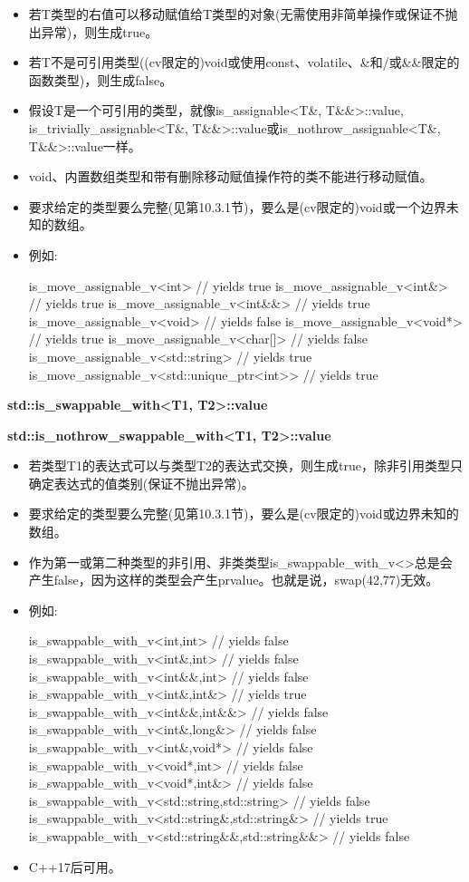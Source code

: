 \begin{itemize}
\item
若T类型的右值可以移动赋值给T类型的对象(无需使用非简单操作或保证不抛出异常)，则生成true。

\item
若T不是可引用类型((cv限定的)void或使用const、volatile、\&和/或\&\&限定的函数类型)，则生成false。

\item
假设T是一个可引用的类型，就像is\_assignable<T\&, T\&\&>::value, is\_trivially\_assignable<T\&, T\&\&>::value或is\_nothrow\_assignable<T\&, T\&\&>::value一样。

\item
void、内置数组类型和带有删除移动赋值操作符的类不能进行移动赋值。

\item
要求给定的类型要么完整(见第10.3.1节)，要么是(cv限定的)void或一个边界未知的数组。

\item
例如:
\begin{cpp}
is_move_assignable_v<int> // yields true
is_move_assignable_v<int&> // yields true
is_move_assignable_v<int&&> // yields true
is_move_assignable_v<void> // yields false
is_move_assignable_v<void*> // yields true
is_move_assignable_v<char[]> // yields false
is_move_assignable_v<std::string> // yields true
is_move_assignable_v<std::unique_ptr<int>> // yields true
\end{cpp}
\end{itemize}

\textbf{std::is\_swappable\_with<T1, T2>::value}

\textbf{std::is\_nothrow\_swappable\_with<T1, T2>::value}

\begin{itemize}
\item
若类型T1的表达式可以与类型T2的表达式交换，则生成true，除非引用类型只确定表达式的值类别(保证不抛出异常)。

\item
要求给定的类型要么完整(见第10.3.1节)，要么是(cv限定的)void或边界未知的数组。

\item
作为第一或第二种类型的非引用、非类类型is\_swappable\_with\_v<>总是会产生false，因为这样的类型会产生prvalue。也就是说，swap(42,77)无效。

\item
例如:
\begin{cpp}
is_swappable_with_v<int,int> // yields false
is_swappable_with_v<int&,int> // yields false
is_swappable_with_v<int&&,int> // yields false
is_swappable_with_v<int&,int&> // yields true
is_swappable_with_v<int&&,int&&> // yields false
is_swappable_with_v<int&,long&> // yields false
is_swappable_with_v<int&,void*> // yields false
is_swappable_with_v<void*,int> // yields false
is_swappable_with_v<void*,int&> // yields false
is_swappable_with_v<std::string,std::string> // yields false
is_swappable_with_v<std::string&,std::string&> // yields true
is_swappable_with_v<std::string&&,std::string&&> // yields false
\end{cpp}

\item
C++17后可用。
\end{itemize}

